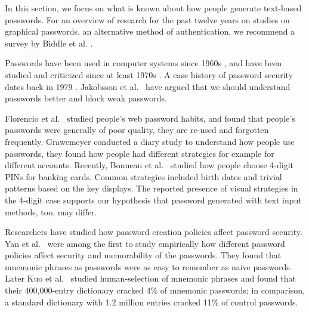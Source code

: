\documentclass[conference]{IEEEtran}
\begin{document}
In this section, we focus on what is known about how people generate text-based passwords. For an overview of research
for the past twelve years on studies  on graphical passwords, an alternative method of authentication,
we recommend a survey by Biddle et al. \cite{Biddle:2012:GPL:2333112.2333114}.


Passwords have been used in computer systems since 1960s  \cite{Wilkes:1975:TSC:540274},
and have been studied and criticized since at least 1970s \cite{Saltzer:1974:PCI:361011.361067}. A case
history of password security dates back in 1979  \cite{Morris:1979:PSC:359168.359172}.
Jakobsson et al.~\cite{benefitspasswords} have argued that we should understand passwords better and
block weak passwords.

Florencio et al.~\cite{Florencio:2007:LSW:1242572.1242661} studied people's web password habits, and found that people's passwords were generally of poor quality, they are re-used and forgotten frequently. Grawemeyer \cite{Grawemeyer:2011:UMM:1994007.1994160} conducted a diary study to understand how people use passwords, they found how people had different strategies for example for different accounts. Recently, Bonneau et al.~\cite{bonneauPINs} studied how people choose 4-digit PINs for banking cards. Common strategies included birth dates and trivial patterns based on the key displays. The reported presence of visual strategies in the 4-digit case supports our hypothesis that password generated with text input methods, too, may differ.

Researchers have studied how password creation policies affect password security. Yan et al.~\cite{Yan:2004:PMS:1024867.1025014} were among the first to study empirically how different password policies affect security and memorability of the passwords. They found that mnemonic phrases as passwords were as easy to remember as naive passwords. Later Kuo et al.~\cite{Kuo:2006:HSM:1143120.1143129} studied human-selection of mnemonic phrases and found that their 400,000-entry dictionary cracked 4\% of mnemonic passwords; in comparison, a standard dictionary with 1.2 million entries cracked 11\% of control passwords.
\end{document}
